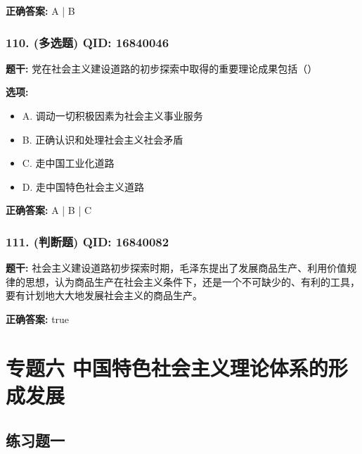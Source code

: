 \documentclass[12pt,UTF8]{ctexart}
\begin{document}
\textbf{正确答案:}
A | B

\vspace{0.3em}\hrulefill\vspace{0.7em}

\subsubsection*{110. (多选题) \small QID: 16840046}

\textbf{题干:}
党在社会主义建设道路的初步探索中取得的重要理论成果包括（）

\textbf{选项:}
\begin{itemize}[leftmargin=*]

  \item A. 调动一切积极因素为社会主义事业服务

  \item B. 正确认识和处理社会主义社会矛盾

  \item C. 走中国工业化道路

  \item D. 走中国特色社会主义道路

\end{itemize}

\textbf{正确答案:}
A | B | C

\vspace{0.3em}\hrulefill\vspace{0.7em}

\subsubsection*{111. (判断题) \small QID: 16840082}

\textbf{题干:}
社会主义建设道路初步探索时期，毛泽东提出了发展商品生产、利用价值规律的思想，认为商品生产在社会主义条件下，还是一个不可缺少的、有利的工具，要有计划地大大地发展社会主义的商品生产。

\textbf{正确答案:}
true

\vspace{0.3em}\hrulefill\vspace{0.7em}

\section*{专题六 中国特色社会主义理论体系的形成发展}
\hrulefill

\subsection*{练习题一}
\end{document}
